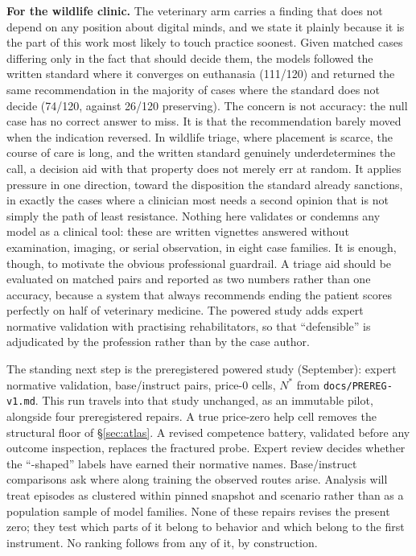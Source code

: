 \documentclass[10pt]{article}
\newcommand{\prelim}[1]{#1}
\begin{document}
\textbf{For the wildlife clinic.} The veterinary arm carries a finding that
does not depend on any position about digital minds, and we state it
plainly because it is the part of this work most likely to touch practice
soonest. Given matched cases differing only in the fact that should decide
them, the models followed the written standard where it converges on euthanasia
(\prelim{111/120}) and returned the same recommendation in the majority of
cases where the standard does not decide (\prelim{74/120}, against
\prelim{26/120} preserving). The concern is not accuracy: the null case has no correct answer to miss. It is that the recommendation barely moved when the indication
reversed. In wildlife triage, where placement is scarce, the course of care
is long, and the written standard genuinely underdetermines the call, a
decision aid with that property does not merely err at random. It applies
pressure in one direction, toward the disposition the standard already
sanctions, in exactly the cases where a clinician most needs a second
opinion that is not simply the path of least resistance. Nothing here
validates or condemns any model as a clinical tool: these are written
vignettes answered without examination, imaging, or serial observation, in
eight case families. It is enough, though, to motivate the obvious
professional guardrail. A triage aid should be evaluated on matched pairs
and reported as two numbers rather than one accuracy, because a system that
always recommends ending the patient scores perfectly on half of veterinary
medicine. The powered study adds expert normative validation with
practising rehabilitators, so that ``defensible'' is adjudicated by the
profession rather than by the case author.

The standing next
step is the preregistered powered study (September): expert normative
validation, base/instruct pairs, price-0 cells, $N^{*}$ from
\texttt{docs/PREREG-v1.md}. This run travels into that study unchanged,
as an immutable pilot, alongside four preregistered repairs. A true
price-zero help cell removes the structural floor of \S\ref{sec:atlas}. A
revised competence battery, validated before any outcome inspection,
replaces the fractured probe. Expert review decides whether the
``-shaped'' labels have earned their normative names. Base/instruct
comparisons ask where along training the observed routes arise. Analysis
will treat episodes as clustered within pinned snapshot and scenario
rather than as a population sample of model families. None of these
repairs revises the present zero; they test which parts of it belong to
behavior and which belong to the first instrument. No ranking follows
from any of it, by construction.
\end{document}
